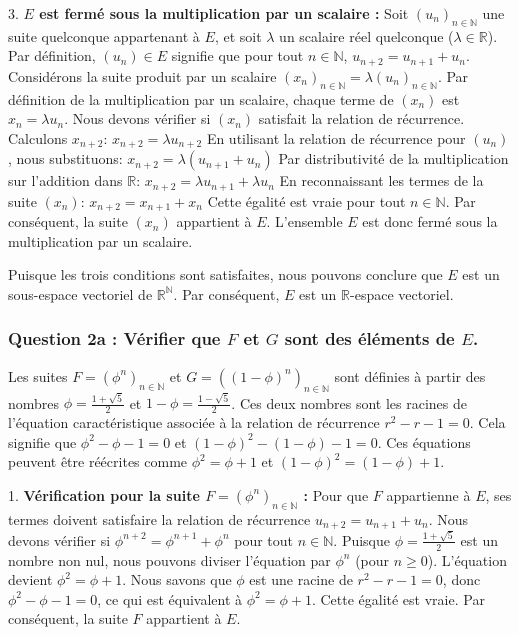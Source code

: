 \documentclass{report}
\begin{document}
3.  \textbf{$E$ est fermé sous la multiplication par un scalaire :}
    Soit $(u_n)_{n \in \mathbb{N}}$ une suite quelconque appartenant à $E$, et soit $\lambda$ un scalaire réel quelconque ($\lambda \in \mathbb{R}$).
    Par définition, $(u_n) \in E$ signifie que pour tout $n \in \mathbb{N}$, $u_{n+2} = u_{n+1} + u_n$.
    Considérons la suite produit par un scalaire $(x_n)_{n \in \mathbb{N}} = \lambda (u_n)_{n \in \mathbb{N}}$. Par définition de la multiplication par un scalaire, chaque terme de $(x_n)$ est $x_n = \lambda u_n$.
    Nous devons vérifier si $(x_n)$ satisfait la relation de récurrence. Calculons $x_{n+2}$:
    $x_{n+2} = \lambda u_{n+2}$
    En utilisant la relation de récurrence pour $(u_n)$, nous substituons:
    $x_{n+2} = \lambda (u_{n+1} + u_n)$
    Par distributivité de la multiplication sur l'addition dans $\mathbb{R}$:
    $x_{n+2} = \lambda u_{n+1} + \lambda u_n$
    En reconnaissant les termes de la suite $(x_n)$:
    $x_{n+2} = x_{n+1} + x_n$
    Cette égalité est vraie pour tout $n \in \mathbb{N}$. Par conséquent, la suite $(x_n)$ appartient à $E$.
    L'ensemble $E$ est donc fermé sous la multiplication par un scalaire.

Puisque les trois conditions sont satisfaites, nous pouvons conclure que $E$ est un sous-espace vectoriel de $\mathbb{R}^{\mathbb{N}}$. Par conséquent, $E$ est un $\mathbb{R}$-espace vectoriel.

\subsubsection*{Question 2a : Vérifier que $F$ et $G$ sont des éléments de $E$.}

Les suites $F = (\phi^n)_{n \in \mathbb{N}}$ et $G = ((1-\phi)^n)_{n \in \mathbb{N}}$ sont définies à partir des nombres $\phi = \frac{1+\sqrt{5}}{2}$ et $1-\phi = \frac{1-\sqrt{5}}{2}$.
Ces deux nombres sont les racines de l'équation caractéristique associée à la relation de récurrence $r^2 - r - 1 = 0$.
Cela signifie que $\phi^2 - \phi - 1 = 0$ et $(1-\phi)^2 - (1-\phi) - 1 = 0$.
Ces équations peuvent être réécrites comme $\phi^2 = \phi + 1$ et $(1-\phi)^2 = (1-\phi) + 1$.

1.  \textbf{Vérification pour la suite $F = (\phi^n)_{n \in \mathbb{N}}$ :}
    Pour que $F$ appartienne à $E$, ses termes doivent satisfaire la relation de récurrence $u_{n+2} = u_{n+1} + u_n$.
    Nous devons vérifier si $\phi^{n+2} = \phi^{n+1} + \phi^n$ pour tout $n \in \mathbb{N}$.
    Puisque $\phi = \frac{1+\sqrt{5}}{2}$ est un nombre non nul, nous pouvons diviser l'équation par $\phi^n$ (pour $n \ge 0$).
    L'équation devient $\phi^2 = \phi + 1$.
    Nous savons que $\phi$ est une racine de $r^2 - r - 1 = 0$, donc $\phi^2 - \phi - 1 = 0$, ce qui est équivalent à $\phi^2 = \phi + 1$.
    Cette égalité est vraie. Par conséquent, la suite $F$ appartient à $E$.
\end{document}
